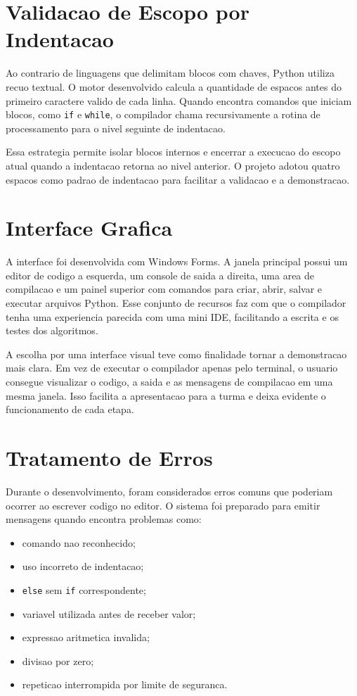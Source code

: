 \documentclass[12pt,a4paper]{article}
\begin{document}
\section{Validacao de Escopo por Indentacao}

Ao contrario de linguagens que delimitam blocos com chaves, Python utiliza recuo textual. O motor desenvolvido calcula a quantidade de espacos antes do primeiro caractere valido de cada linha. Quando encontra comandos que iniciam blocos, como \texttt{if} e \texttt{while}, o compilador chama recursivamente a rotina de processamento para o nivel seguinte de indentacao.

Essa estrategia permite isolar blocos internos e encerrar a execucao do escopo atual quando a indentacao retorna ao nivel anterior. O projeto adotou quatro espacos como padrao de indentacao para facilitar a validacao e a demonstracao.

\section{Interface Grafica}

A interface foi desenvolvida com Windows Forms. A janela principal possui um editor de codigo a esquerda, um console de saida a direita, uma area de compilacao e um painel superior com comandos para criar, abrir, salvar e executar arquivos Python. Esse conjunto de recursos faz com que o compilador tenha uma experiencia parecida com uma mini IDE, facilitando a escrita e os testes dos algoritmos.

A escolha por uma interface visual teve como finalidade tornar a demonstracao mais clara. Em vez de executar o compilador apenas pelo terminal, o usuario consegue visualizar o codigo, a saida e as mensagens de compilacao em uma mesma janela. Isso facilita a apresentacao para a turma e deixa evidente o funcionamento de cada etapa.

\section{Tratamento de Erros}

Durante o desenvolvimento, foram considerados erros comuns que poderiam ocorrer ao escrever codigo no editor. O sistema foi preparado para emitir mensagens quando encontra problemas como:

\begin{itemize}
    \item comando nao reconhecido;
    \item uso incorreto de indentacao;
    \item \texttt{else} sem \texttt{if} correspondente;
    \item variavel utilizada antes de receber valor;
    \item expressao aritmetica invalida;
    \item divisao por zero;
    \item repeticao interrompida por limite de seguranca.
\end{itemize}
\end{document}

